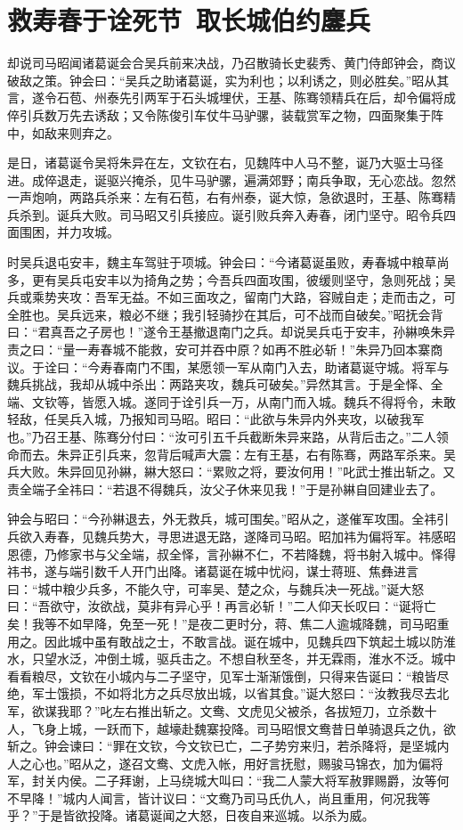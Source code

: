 \chapter{救寿春于诠死节~取长城伯约鏖兵}

却说司马昭闻诸葛诞会合吴兵前来决战，乃召散骑长史裴秀、黄门侍郎钟会，商议破敌之策。钟会曰：“吴兵之助诸葛诞，实为利也；以利诱之，则必胜矣。”昭从其言，遂令石苞、州泰先引两军于石头城埋伏，王基、陈骞领精兵在后，却令偏将成倅引兵数万先去诱敌；又令陈俊引车仗牛马驴骡，装载赏军之物，四面聚集于阵中，如敌来则弃之。

是日，诸葛诞令吴将朱异在左，文钦在右，见魏阵中人马不整，诞乃大驱士马径进。成倅退走，诞驱兴掩杀，见牛马驴骡，遍满郊野；南兵争取，无心恋战。忽然一声炮响，两路兵杀来：左有石苞，右有州泰，诞大惊，急欲退时，王基、陈骞精兵杀到。诞兵大败。司马昭又引兵接应。诞引败兵奔入寿春，闭门坚守。昭令兵四面围困，并力攻城。

时吴兵退屯安丰，魏主车驾驻于项城。钟会曰：“今诸葛诞虽败，寿春城中粮草尚多，更有吴兵屯安丰以为掎角之势；今吾兵四面攻围，彼缓则坚守，急则死战；吴兵或乘势夹攻：吾军无益。不如三面攻之，留南门大路，容贼自走；走而击之，可全胜也。吴兵远来，粮必不继；我引轻骑抄在其后，可不战而自破矣。”昭抚会背曰：“君真吾之子房也！”遂令王基撤退南门之兵。却说吴兵屯于安丰，孙綝唤朱异责之曰：“量一寿春城不能救，安可并吞中原？如再不胜必斩！”朱异乃回本寨商议。于诠曰：“今寿春南门不围，某愿领一军从南门入去，助诸葛诞守城。将军与魏兵挑战，我却从城中杀出：两路夹攻，魏兵可破矣。”异然其言。于是全怿、全端、文钦等，皆愿入城。遂同于诠引兵一万，从南门而入城。魏兵不得将令，未敢轻敌，任吴兵入城，乃报知司马昭。昭曰：“此欲与朱异内外夹攻，以破我军也。”乃召王基、陈骞分付曰：“汝可引五千兵截断朱异来路，从背后击之。”二人领命而去。朱异正引兵来，忽背后喊声大震：左有王基，右有陈骞，两路军杀来。吴兵大败。朱异回见孙綝，綝大怒曰：“累败之将，要汝何用！”叱武士推出斩之。又责全端子全祎曰：“若退不得魏兵，汝父子休来见我！”于是孙綝自回建业去了。

钟会与昭曰：“今孙綝退去，外无救兵，城可围矣。”昭从之，遂催军攻围。全祎引兵欲入寿春，见魏兵势大，寻思进退无路，遂降司马昭。昭加祎为偏将军。祎感昭恩德，乃修家书与父全端，叔全怿，言孙綝不仁，不若降魏，将书射入城中。怿得祎书，遂与端引数千人开门出降。诸葛诞在城中忧闷，谋士蒋班、焦彝进言曰：“城中粮少兵多，不能久守，可率吴、楚之众，与魏兵决一死战。”诞大怒曰：“吾欲守，汝欲战，莫非有异心乎！再言必斩！”二人仰天长叹曰：“诞将亡矣！我等不如早降，免至一死！”是夜二更时分，蒋、焦二人逾城降魏，司马昭重用之。因此城中虽有敢战之士，不敢言战。诞在城中，见魏兵四下筑起土城以防淮水，只望水泛，冲倒土城，驱兵击之。不想自秋至冬，并无霖雨，淮水不泛。城中看看粮尽，文钦在小城内与二子坚守，见军士渐渐饿倒，只得来告诞曰：“粮皆尽绝，军士饿损，不如将北方之兵尽放出城，以省其食。”诞大怒曰：“汝教我尽去北军，欲谋我耶？”叱左右推出斩之。文鸯、文虎见父被杀，各拔短刀，立杀数十人，飞身上城，一跃而下，越壕赴魏寨投降。司马昭恨文鸯昔日单骑退兵之仇，欲斩之。钟会谏曰：“罪在文钦，今文钦已亡，二子势穷来归，若杀降将，是坚城内人之心也。”昭从之，遂召文鸯、文虎入帐，用好言抚慰，赐骏马锦衣，加为偏将军，封关内侯。二子拜谢，上马绕城大叫曰：“我二人蒙大将军赦罪赐爵，汝等何不早降！”城内人闻言，皆计议曰：“文鸯乃司马氏仇人，尚且重用，何况我等乎？”于是皆欲投降。诸葛诞闻之大怒，日夜自来巡城。以杀为威。

